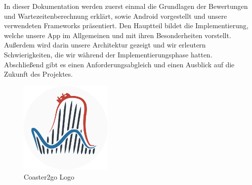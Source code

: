 In dieser Dokumentation werden zuerst einmal die Grundlagen der Bewertungen und Wartezeitenberechnung erklärt, sowie Android vorgestellt und unsere verwendeten Frameworks präsentiert. Den Hauptteil bildet die Implementierung, welche unsere App im Allgemeinen und mit ihren Besonderheiten vorstellt. Außerdem wird darin unsere Architektur gezeigt und wir erleutern Schwierigkeiten, die wir während der Implementierungsphase hatten. Abschließend gibt es einen Anforderungsabgleich und einen Ausblick auf die Zukunft des Projektes.\\

\begin{figure}[htp]
	\centering
  	\includegraphics[width=0.4\textwidth]{img/coaster42_logo.png}
	\caption{Coaster2go Logo}
	\label{figure:coaster2gologo}
\end{figure}
